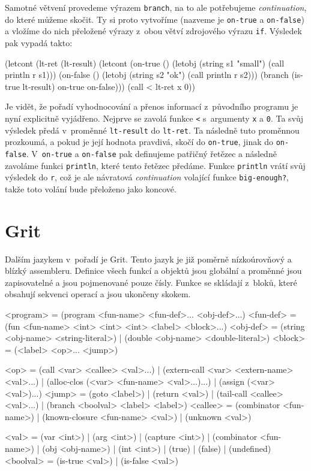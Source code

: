 Samotné větvení provedeme výrazem \texttt{branch}, na to ale potřebujeme
\emph{continuation}, do které můžeme skočit. Ty si proto vytvoříme (nazveme je 
\texttt{on-true} a \texttt{on-false}) a vložíme do nich přeložené výrazy z~obou
větví zdrojového výrazu \texttt{if}. Výsledek pak vypadá takto:

\begin{spine}
(letcont (lt-ret (lt-result)
            (letcont (on-true ()
                        (letobj (string s1 "small") (call println r s1)))
                     (on-false ()
                        (letobj (string s2 "ok") (call println r s2)))
              (branch (is-true lt-result) on-true on-false)))
  (call < lt-ret x 0))
\end{spine}

Je vidět, že pořadí vyhodnocování a přenos informací z~původního programu je
nyní explicitně vyjádřeno. Nejprve se zavolá funkce \texttt{<} s~argumenty
\texttt{x} a \texttt{0}. Ta svůj výsledek předá v~proměnné \texttt{lt-result} do
\texttt{lt-ret}. Ta následně tuto proměnnou prozkoumá, a pokud je její hodnota
pravdivá, skočí do \texttt{on-true}, jinak do \texttt{on-false}.
V~\texttt{on-true} a \texttt{on-false} pak definujeme patřičný řetězec a
následně zavoláme funkci \texttt{println}, které tento řetězec předáme. Funkce
\texttt{println} vrátí svůj výsledek do \texttt{r}, což je ale návratová
\emph{continuation} volající funkce \texttt{big-enough?}, takže toto volání bude
přeloženo jako koncové.

\section{Grit}

Dalším jazykem v~pořadí je Grit. Tento jazyk je již poměrně nízkoúrovňový a
blízký assembleru. Definice všech funkcí a objektů jsou globální a proměnné jsou
zapisovatelné a jsou pojmenované pouze čísly. Funkce se skládají z~bloků, které
obsahují sekvenci operací a jsou ukončeny skokem.

\begin{gram}
<program>   = (program <fun-name> <fun-def>... <obj-def>...)
<fun-def>   = (fun <fun-name> <int> <int> <int> <label> <block>...)
<obj-def>   = (string <obj-name> <string-literal>)
            | (double <obj-name> <double-literal>)
<block>     = (<label> <op>... <jump>)

<op>        = (call <var> <callee> <val>...)
            | (extern-call <var> <extern-name> <val>...)
            | (alloc-clos (<var> <fun-name> <val>...)...)
            | (assign (<var> <val>)...)
<jump>      = (goto <label>)
            | (return <val>)
            | (tail-call <callee> <val>...)
            | (branch <boolval> <label> <label>)
<callee>    = (combinator <fun-name>)
            | (known-closure <fun-name> <val>)
            | (unknown <val>)

<val>       = (var <int>)
            | (arg <int>)
            | (capture <int>)
            | (combinator <fun-name>)
            | (obj <obj-name>)
            | (int <int>)
            | (true)
            | (false)
            | (undefined)
<boolval>   = (is-true <val>) | (is-false <val>)
\end{gram}

